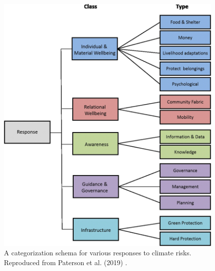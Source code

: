 \begin{figure}
    \centering
    \includegraphics[width=\columnwidth]{figures/risk-response.png}
    \caption{A categorization schema for various responses to climate risks.
    Reproduced from Paterson et al. (2019)
    \cite{paterson_community-based_2019}.}
    \label{fig:risk-response}
\end{figure}


